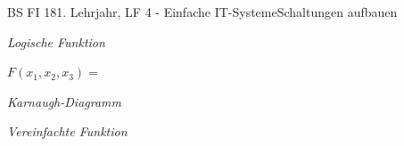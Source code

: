 \documentclass[oneside,openany,headings=optiontotoc,11pt,numbers=noenddot]{scrreprt}
\begin{document}
\begin{worksheet}{BS FI 18}{1. Lehrjahr, LF 4 - Einfache IT-Systeme}{Schaltungen aufbauen}
\begin{framed}
			\par\noindent
			\tiny{\textit{\color{codegray}Logische Funktion}}\\
			\par\noindent
			\par\noindent\normalsize
			\(F(x_1,x_2,x_3) = \)
		\end{framed}
		\begin{framed}
			\begin{minipage}{0.48\textwidth}
				\tiny{\textit{\color{codegray}Karnaugh-Diagramm}}\\
				\normalsize
			\end{minipage}
			\hfill
			\begin{minipage}{0.48\textwidth}
					\begin{minipage}{0.48\textwidth}
					\tiny{\textit{\color{codegray}Vereinfachte Funktion}}\\
					\normalsize
				\end{minipage}
			\end{minipage}
			\begin{minipage}{0.48\textwidth}
				
				\begin{karnaugh-map}[4][2][1][$x_2x_3$][$x_1$]
					

\end{karnaugh-map}
\end{minipage}
\end{framed}
\end{worksheet}
\end{document}
